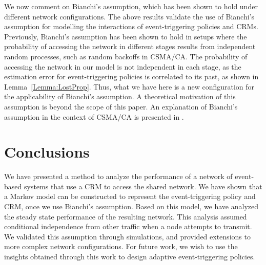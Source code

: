 \documentclass[journal]{IEEEtran}
\begin{document}
We now comment on Bianchi's assumption, which has been shown to hold under different network configurations. The above results validate the use of Bianchi's assumption for modelling the interactions of event-triggering policies and CRMs. Previously, Bianchi's assumption has been shown to hold in setups where the probability of accessing the network in different stages results from independent random processes, such as random backoffs in CSMA/CA. The probability of accessing the network in our model is not independent in each stage, as the estimation error for event-triggering policies is correlated to its past, as shown in Lemma~\ref{Lemma:LostProp}. Thus, what we have here is a new configuration for the applicability of Bianchi's assumption. A theoretical motivation of this assumption is beyond the scope of this paper. An explanation of Bianchi's assumption in the context of CSMA/CA is presented in \cite{Bordenave2010}.

\section{Conclusions} \label{S:Concl}

We have presented a method to analyze the performance of a network of event-based systems that use a CRM to access the shared network. We have shown that a Markov model can be constructed to represent the event-triggering policy and CRM, once we use Bianchi's assumption. Based on this model, we have analyzed the steady state performance of the resulting network. This analysis assumed conditional independence from other traffic when a node attempts to transmit. We validated this assumption through simulations, and provided extensions to more complex network configurations. For future work, we wish to use the insights obtained through this work to design adaptive event-triggering policies.



\end{document}
